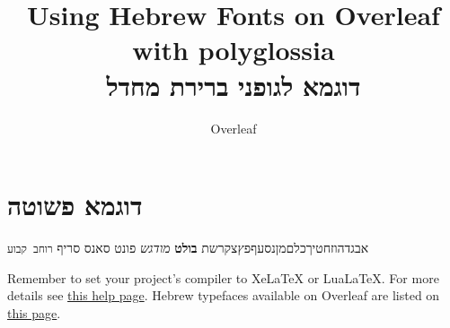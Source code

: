 \documentclass[12pt]{article}
\title{\textenglish{Using Hebrew Fonts on Overleaf with polyglossia}\\דוגמא לגופני ברירת מחדל}
\author{\textenglish{Overleaf}}
\begin{document}
\maketitle

\section{דוגמא פשוטה}
אבגדהוזחטיךכלםמןנסעףפץצקרשת \textbf{בולט} \emph{מודגש} \textsf{פונט סאנס סריף} \texttt{רוחב קבוע}

\begin{english}
Remember to set your project's compiler to XeLaTeX or LuaLaTeX. For more details see \href{https://www.overleaf.com/learn/latex/Multilingual_typesetting_on_Overleaf_using_polyglossia_and_fontspec}{this help page}. Hebrew typefaces available on Overleaf are listed on \href{https://www.overleaf.com/learn/latex/Questions/Which_OTF_or_TTF_fonts_are_supported_via_fontspec%3F#Fonts_for_Hebrew_script}{this page}.
\end{english}
\end{document}
